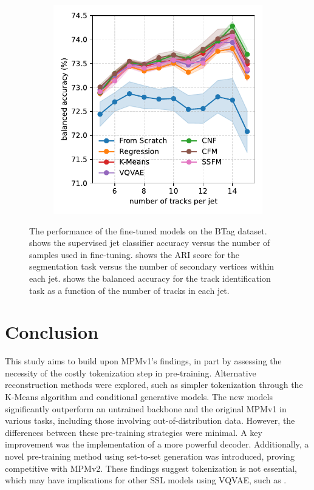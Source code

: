 \begin{figure}[h!]
\begin{subfigure}[b]{0.32\textwidth}
        \caption{}
        \label{fig:vtx}
    \end{subfigure}
    \begin{subfigure}[b]{0.32\textwidth}
        \centering
        \includegraphics[width=\linewidth]{Figures/foundation_models/mpm2/final/trk_finetune.pdf}
        \caption{}
        \label{fig:trk}
    \end{subfigure}
    \caption{The performance of the fine-tuned models on the BTag dataset.  shows the supervised jet classifier accuracy versus the number of samples used in fine-tuning.
         shows the ARI score for the segmentation task versus the number of secondary vertices within each jet.  shows the balanced accuracy for the track identification task as a function of the number of tracks in each jet.}
    \label{fig:plot_B}
\end{figure}

\section{Conclusion}
\label{sec:conclusion}

This study aims to build upon MPMv1's findings, in part by assessing the necessity of the costly tokenization step in pre-training.
Alternative reconstruction methods were explored, such as simpler tokenization through the K-Means algorithm and conditional generative models.
The new models significantly outperform an untrained backbone and the original MPMv1 in various tasks, including those involving out-of-distribution data. However, the differences between these pre-training strategies were minimal.
A key improvement was the implementation of a more powerful decoder.
Additionally, a novel pre-training method using set-to-set generation was introduced, proving competitive with MPMv2.
These findings suggest tokenization is not essential, which may have implications for other SSL models using VQVAE, such as \textcite{Omnijet}.


